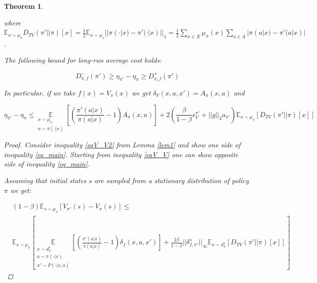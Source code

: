 \documentclass[11pt]{article}
\newcommand{\E}{\mathbb{E}}
\newtheorem{theorem}{Theorem}
\theoremstyle{definition}
\numberwithin{equation}{section}
\begin{document}
\begin{theorem}
\begin{itemize}
  where $\E_{x\sim \mu_{\pi}} D_{TV}(\pi'||\pi)[x] = \frac{1}{2}\E_{x\sim \mu_{\pi}} || \pi(\cdot|x) - \pi'(\cdot|x) ||_1 =\frac{1}{2} \sum\limits_{x\in X} \mu_\pi(x) \sum\limits_{a\in A}| \pi(a|x) - \pi'(a|x)|$.
\end{itemize}


The following bound for long-run average cost holds:

\begin{equation}\label{eq_main}
D_{\pi, f}^{-} (\pi')\geq \eta_{\pi'} - \eta_\pi\geq D_{\pi, f}^{+} (\pi')
\end{equation}

In particular, if we take $f(x) = V_\pi(x)$ we get $\delta_V(x, a, x') = A_\pi(x, a)$ and


\begin{equation}
 \eta_{\pi'} - \eta_\pi\leq \underset{\substack{ x\sim \mu_\pi\\ a\sim \pi(\cdot|x)}}{\E}\left[\left( \frac{\pi'(a| x)}{\pi(a|x)}-1 \right)A_\pi(x, a) \right] + 2\left(\frac{\beta}{1-\beta}\epsilon_V^{\pi'} +  ||g||_2 a_{\pi'}\right) \E_{x\sim \mu_\pi}[D_{TV}(\pi'||\pi)[x]]
\end{equation}
\begin{proof}
Consider inequality \ref{eqV_V2} from Lemma \ref{lem1} and show one side of inequality \ref{eq_main}. Starting from inequality \ref{eqV_V} one can show opposite side  of inequality \ref{eq_main}.

Assuming that initial states $s$ are sampled from a stationary distribution of policy $\pi$ we get:

\begin{align*}
&(1-\beta)\E_{s\sim \mu_\pi}\left[ V_{\pi'}(s) - V_\pi(s)\right] \leq\\& \E_{s\sim \mu_\pi}\left[\underset{\substack{ x\sim d^s_\pi\\ a\sim \pi(\cdot|x)\\x'\sim P(\cdot|x, a)}}{\E}\left[\left( \frac{\pi'(a| x)}{\pi(a|x)}-1 \right)\delta_f(x, a, x') \right]  + \frac{2\beta}{1- \beta}||\delta_{f,\pi'}^s ||_\infty \E_{x\sim d^s_\pi} [D_{TV}(\pi'||\pi)[x]] \right]
\end{align*}




\end{proof}
\end{theorem}
\end{document}
